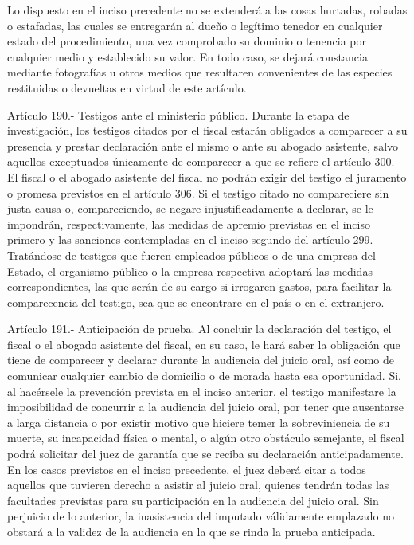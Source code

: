     Lo dispuesto en el inciso precedente no se extenderá a las cosas hurtadas, robadas o estafadas, las cuales se entregarán al dueño o legítimo tenedor en cualquier estado del procedimiento, una vez comprobado su dominio o tenencia por cualquier medio y establecido su valor.
    En todo caso, se dejará constancia mediante fotografías u otros medios que resultaren convenientes de las especies restituidas o devueltas en virtud de este artículo.

    Artículo 190.- Testigos ante el ministerio público. Durante la etapa de investigación, los testigos citados por el fiscal estarán obligados a comparecer a su presencia y prestar declaración ante el mismo o ante su abogado asistente, salvo aquellos exceptuados únicamente de comparecer a que se refiere el artículo 300. El fiscal o el abogado asistente del fiscal no podrán exigir del testigo el juramento o promesa previstos en el artículo 306.
    Si el testigo citado no compareciere sin justa causa o, compareciendo, se negare injustificadamente a declarar, se le impondrán, respectivamente, las medidas de apremio previstas en el inciso primero y las sanciones contempladas en el inciso segundo del artículo 299.
    Tratándose de testigos que fueren empleados públicos o de una empresa del Estado, el organismo público o la empresa respectiva adoptará las medidas correspondientes, las que serán de su cargo si irrogaren gastos, para facilitar la comparecencia del testigo, sea que se encontrare en el país o en el extranjero.



    Artículo 191.- Anticipación de prueba. Al concluir la declaración del testigo, el fiscal o el abogado asistente del fiscal, en su caso, le hará saber la obligación que tiene de comparecer y declarar durante la audiencia del juicio oral, así como de comunicar cualquier cambio de domicilio o de morada hasta esa oportunidad.
    Si, al hacérsele la prevención prevista en el inciso anterior, el testigo manifestare la imposibilidad de concurrir a la audiencia del juicio oral, por tener que ausentarse a larga distancia o por existir motivo que hiciere temer la sobreviniencia de su muerte, su incapacidad física o mental, o algún otro obstáculo semejante, el fiscal podrá solicitar del juez de garantía que se reciba su declaración anticipadamente.
    En los casos previstos en el inciso precedente, el juez deberá citar a todos aquellos que tuvieren derecho a asistir al juicio oral, quienes tendrán todas las facultades previstas para su participación en la audiencia del juicio oral.
    Sin perjuicio de lo anterior, la inasistencia del imputado válidamente emplazado no obstará a la validez de la audiencia en la que se rinda la prueba anticipada.

